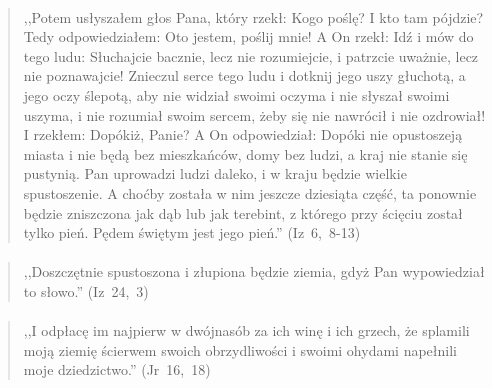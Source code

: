 \documentclass[10pt,a4paper,oneside]{article}
\begin{document}
\paragraph{}
\begin{quote}
,,Potem usłyszałem głos Pana, który rzekł: Kogo poślę? I kto tam pójdzie? Tedy odpowiedziałem: Oto jestem, poślij mnie! A On rzekł: Idź i mów do tego ludu: Słuchajcie bacznie, lecz nie rozumiejcie, i patrzcie uważnie, lecz nie poznawajcie! Znieczul serce tego ludu i dotknij jego uszy głuchotą, a jego oczy ślepotą, aby nie widział swoimi oczyma i nie słyszał swoimi uszyma, i nie rozumiał swoim sercem, żeby się nie nawrócił i nie ozdrowiał! I rzekłem: Dopókiż, Panie? A On odpowiedział: Dopóki nie opustoszeją miasta i nie będą bez mieszkańców, domy bez ludzi, a kraj nie stanie się pustynią. Pan uprowadzi ludzi daleko, i w kraju będzie wielkie spustoszenie. A choćby została w nim jeszcze dziesiąta część, ta ponownie będzie zniszczona jak dąb lub jak terebint, z którego przy ścięciu został tylko pień. Pędem świętym jest jego pień.'' \mbox{(Iz 6, 8-13)}
\end{quote}
\paragraph{}
\begin{quote}
,,Doszczętnie spustoszona i złupiona będzie ziemia, gdyż Pan wypowiedział to słowo.'' \mbox{(Iz 24, 3)}
\end{quote}
\paragraph{}
\begin{quote}
,,I odpłacę im najpierw w dwójnasób za ich winę i ich grzech, że splamili moją ziemię ścierwem swoich obrzydliwości i swoimi ohydami napełnili moje dziedzictwo.'' \mbox{(Jr 16, 18)}
\end{quote}
\end{document}
